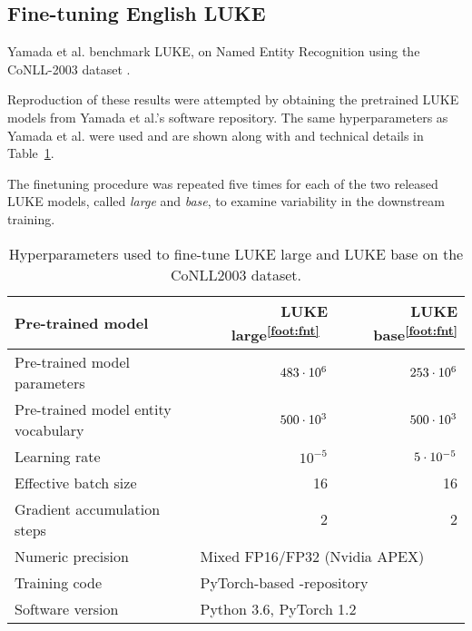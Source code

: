 \documentclass[main.tex]{subfiles}
\begin{document}
\subsection{Fine-tuning English LUKE}
Yamada et al. benchmark LUKE, on Named Entity Recognition using the CoNLL-2003 dataset \cite{yamada2020luke}.

Reproduction of these results were attempted by obtaining the pretrained LUKE models from Yamada et al.'s software repository.
The same hyperparameters as Yamada et al. were used and are shown along with and technical details in Table~\ref{tab:params}.

The finetuning procedure was repeated five times for each of the two released LUKE models, called \emph{large} and \emph{base}, to examine variability in the downstream training.
\addtocounter{footnote}{1}
\begin{table}[H]
    \centering
    \begin{tabular}{l|rr}
        Pre-trained model
                                    & LUKE large\textsuperscript{\ref{foot:fnt}}\
                                                & LUKE base\textsuperscript{\ref{foot:fnt}}\\\hline
        Pre-trained model parameters & $483\cdot10^{6}$ & $253\cdot10^{6}$\\
        Pre-trained model entity vocabulary & $500\cdot10^{3}$ & $500\cdot10^{3}$\\
        Learning rate               & $10^{-5}$ & $5\cdot10^{-5}$\\
        Effective batch size        & 16 & 16\\
        Gradient accumulation steps & 2 & 2\\
        Numeric precision           & \multicolumn{2}{l}{Mixed FP16/FP32 (Nvidia APEX)}\\
        Training code               & \multicolumn{2}{l}{PyTorch-based \code{luke}-repository\protect\footnotemark}\\
        Software version            & \multicolumn{2}{l}{Python 3.6, PyTorch 1.2}
    \end{tabular}
    \caption{Hyperparameters used to fine-tune LUKE large and LUKE base on the CoNLL2003 dataset.}
    \label{tab:params}
\end{table}
\end{document}
